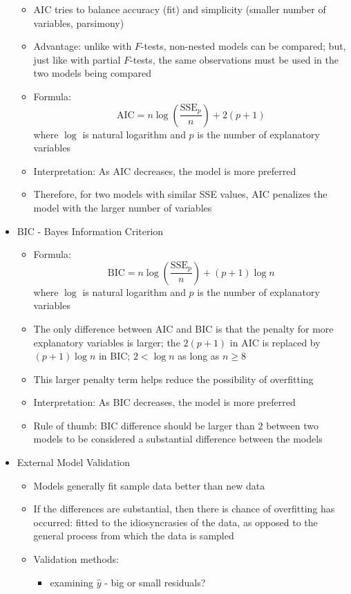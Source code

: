 \documentclass[12pt]{article}
\begin{document}
\begin{itemize}
\begin{itemize}
\item AIC tries to balance accuracy (fit) and simplicity (smaller number of variables, parsimony) 
\item Advantage: unlike with $F$-tests, non-nested models can be compared; but, just like with partial $F$-tests, the same observations must be used in the two models being compared 
\item Formula: $$ \text{AIC} = n\log\left( \frac{\text{SSE}_p}{n} \right) + 2(p+1) $$ where $\log$ is natural logarithm and $p$ is the number of explanatory variables 
\item Interpretation: As AIC decreases, the model is more preferred 
\item Therefore, for two models with similar SSE values, AIC penalizes the model with the larger number of variables \end{itemize} 
\item BIC - Bayes Information Criterion \begin{itemize} 
\item Formula: $$ \text{BIC} = n\log \left( \frac{\text{SSE}_p}{n} \right) + (p+1)\log n $$ where $\log$ is natural logarithm and $p$ is the number of explanatory variables 
\item The only difference between AIC and BIC is that the penalty for more explanatory variables is larger; the $2(p+1)$ in AIC is replaced by $(p+1)\log n$ in BIC; $2 < \log n$ as long as $n \geq 8$
\item This larger penalty term helps reduce the possibility of overfitting 
\item Interpretation: As BIC decreases, the model is more preferred 
\item Rule of thumb: BIC difference should be larger than $2$ between two models to be considered a substantial difference between the models \end{itemize} 
\item External Model Validation \begin{itemize} 
\item Models generally fit sample data better than new data
\item If the differences are substantial, then there is chance of overfitting has occurred: fitted to the idiosyncrasies of the data, as opposed to the general process from which the data is sampled 
\item Validation methods: \begin{itemize} 
\item examining $\hat{y}$ - big or small residuals? 

\end{itemize}
\end{itemize}
\end{itemize}
\end{document}
